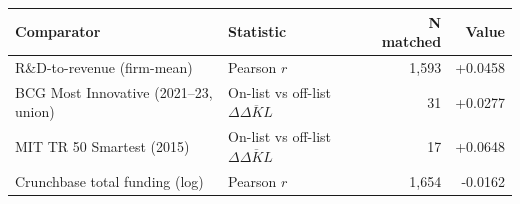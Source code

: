 \begin{tabular}{llrr}
\toprule
Comparator & Statistic & N matched & Value \\
\midrule
R\&D-to-revenue (firm-mean) & Pearson $r$ & 1,593 & +0.0458 \\
BCG Most Innovative (2021--23, union) & On-list vs off-list $\Delta\overline{\Delta KL}$ & 31 & +0.0277 \\
MIT TR 50 Smartest (2015) & On-list vs off-list $\Delta\overline{\Delta KL}$ & 17 & +0.0648 \\
Crunchbase total funding (log) & Pearson $r$ & 1,654 & -0.0162 \\
\bottomrule
\end{tabular}
